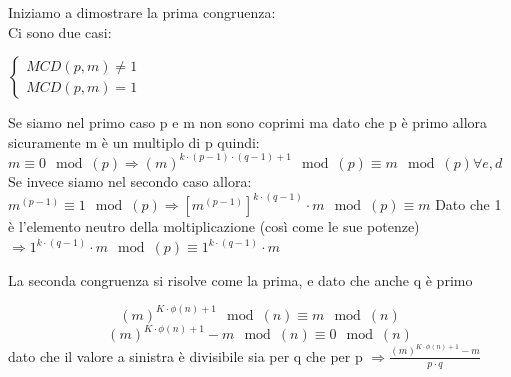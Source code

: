 \documentclass[10pt,a4paper]{article}
\begin{document}
Iniziamo a dimostrare la prima congruenza:\\
Ci sono due casi:
\begin{center}
$\begin{cases}
MCD(p,m)\not=1\\
MCD(p,m)=1
\end{cases}
$\\
\end{center}
Se siamo nel primo caso p e m non sono coprimi ma dato che p è primo allora sicuramente m è un multiplo di p quindi:\\
$m\equiv 0 \mod(p) \Rightarrow (m)^{k\cdot(p-1)\cdot(q-1)+1}\mod(p)\equiv m \mod(p)  \forall e,d$\\
Se invece siamo nel secondo caso allora:\\
$m^{(p-1)} \equiv 1 \mod(p) \Rightarrow [m^{(p-1)}]^{k\cdot (q-1)}\cdot m \mod(p) \equiv m $ Dato che 1 è l'elemento neutro della moltiplicazione (così come le sue potenze) $ \Rightarrow 1^{k\cdot (q-1)}\cdot m \mod(p) \equiv 1^{k\cdot(q-1)}\cdot m$

La seconda congruenza si risolve come la prima, e dato che anche q è primo

$$(m)^{K \cdot \phi(n)+1}\mod(n) \equiv m \mod(n) $$
$$(m)^{K \cdot \phi(n)+1} - m\mod(n) \equiv 0 \mod(n)$$
dato che il valore a sinistra è divisibile sia per q che per p $\Rightarrow \frac{(m)^{K \cdot \phi(n)+1} - m}{p\cdot q}$
\end{document}
